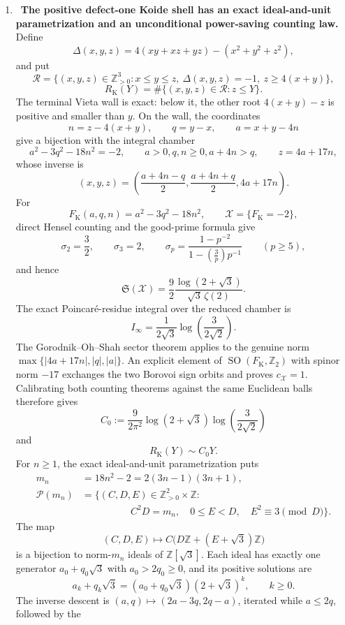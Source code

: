 \begin{enumerate}[leftmargin=1.8em,itemsep=.65em]
\item \Verified\ \textbf{The positive defect-one Koide shell has an exact
ideal-and-unit parametrization and an unconditional power-saving counting
law.}
Define
\[
 \Delta(x,y,z)=4(xy+xz+yz)-(x^2+y^2+z^2),
\]
and put
\[
 \mathcal R=\{(x,y,z)\in\mathbb Z_{>0}^3:
 x\le y\le z,\ \Delta(x,y,z)=-1,\ z\ge4(x+y)\},
\]
\[
 R_{\mathrm K}(Y)
 =\#\{(x,y,z)\in\mathcal R:z\le Y\}.
\]
The terminal Vieta wall is exact: below it,
the other root \(4(x+y)-z\) is positive and smaller than \(y\).  On the wall,
the coordinates
\[
n=z-4(x+y),\qquad q=y-x,\qquad a=x+y-4n
\]
give a bijection with the integral chamber
\[
a^2-3q^2-18n^2=-2,\qquad
a>0, q,n\ge0, a+4n>q,\qquad z=4a+17n,
\]
whose inverse is
\[
 (x,y,z)=
 \left(\frac{a+4n-q}{2},\frac{a+4n+q}{2},4a+17n\right).
\]
For
\[
 F_{\mathrm K}(a,q,n)=a^2-3q^2-18n^2,\qquad
 \mathscr X=\{F_{\mathrm K}=-2\},
\]
direct
Hensel counting and the good-prime formula give
\[
\sigma_2=\frac32,\qquad \sigma_3=2,\qquad
 \sigma_p=\frac{1-p^{-2}}
 {1-\left(\frac3p\right)p^{-1}}\qquad(p\ge5),
\]
and hence
\[
 \mathfrak S(\mathscr X)
 =\frac92\frac{\log(2+\sqrt3)}{\sqrt3\,\zeta(2)}.
\]
The exact Poincar\'e-residue integral over the reduced chamber is
\[
 I_\infty=\frac1{2\sqrt3}\log\!\left(\frac3{2\sqrt2}\right).
\]
The Gorodnik--Oh--Shah sector theorem applies to the genuine norm
\(\max\{|4a+17n|,|q|,|a|\}\).  An explicit element of
\(\operatorname{SO}(F_{\mathrm K},\mathbb Z_2)\) with spinor norm \(-17\) exchanges the
two Borovoi sign orbits and proves \(c_{\mathscr X}=1\).  Calibrating both
counting theorems against the same Euclidean balls therefore gives
\[
 C_0:=\frac9{2\pi^2}\log(2+\sqrt3)
 \log\!\left(\frac3{2\sqrt2}\right)
\]
and
\[
 \boxed{R_{\mathrm K}(Y)\sim C_0Y.}
\]
For \(n\geq1\), the exact ideal-and-unit parametrization puts
\[
\begin{aligned}
 m_n&=18n^2-2=2(3n-1)(3n+1),\\
 \mathcal P(m_n)&=\bigl\{(C,D,E)\in\mathbb Z_{>0}^2\times\mathbb Z:\\
 &\hspace{5em}C^2D=m_n,\quad 0\leq E<D,\quad
 E^2\equiv3\pmod D\bigr\}.
\end{aligned}
\]
The map
\[
 (C,D,E)\longmapsto
 C\bigl(D\mathbb Z+(E+\sqrt3)\mathbb Z\bigr)
\]
is a bijection to norm-\(m_n\) ideals of \(\mathbb Z[\sqrt3]\).  Each ideal
has exactly one generator \(a_0+q_0\sqrt3\) with \(a_0>2q_0\geq0\), and its
positive solutions are
\[
 a_k+q_k\sqrt3=(a_0+q_0\sqrt3)(2+\sqrt3)^k,\qquad k\geq0.
\]
The inverse descent is
\((a,q)\mapsto(2a-3q,2q-a)\), iterated while \(a\leq2q\), followed by the

\end{enumerate}
